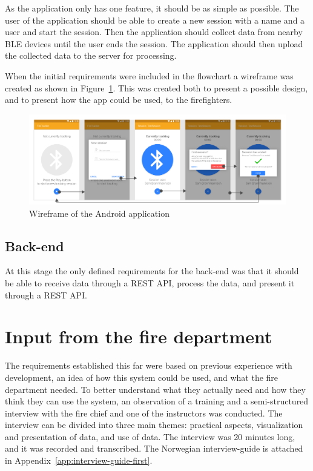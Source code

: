 \documentclass[../Main/thesis.tex]{subfiles}
\begin{document}
As the application only has one feature, it should be as simple as possible. 
The user of the application should be able to create a new session with a name and a user and start the session. 
Then the application should collect data from nearby BLE devices until the user ends the session.
The application should then upload the collected data to the server for processing.

When the initial requirements were included in the flowchart a wireframe was created as shown in Figure~\ref{fig:wireframe-app-1}.
This was created both to present a possible design, and to present how the app could be used, to the firefighters. 

\begin{figure}[h]
	\centering
	\includegraphics[width=\linewidth]{../fig/wireframe_app_1}
	\caption{Wireframe of the Android application}
	\label{fig:wireframe-app-1}
\end{figure}

\subsection{Back-end}
At this stage the only defined requirements for the back-end was that it should be able to receive data through a REST API, process the data, and present it through a REST API.

\section{Input from the fire department}
The requirements established this far were based on previous experience with development, an idea of how this system could be used, and what the fire department needed.
To better understand what they actually need and how they think they can use the system, an observation of a training and a semi-structured interview with the fire chief and one of the instructors was conducted.
The interview can be divided into three main themes: practical aspects, visualization and presentation of data, and use of data.
The interview was 20 minutes long, and it was recorded and transcribed.
The Norwegian interview-guide is attached in Appendix~\ref{app:interview-guide-first}.
\end{document}
